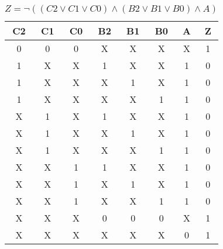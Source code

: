 \begin{center}
    \begin{table}[h] \caption{\(Z = \lnot ((C2 \lor C1 \lor C0) \land (B2 \lor B1 \lor B0) \land A) \)}
        \begin{center}
            \begin{tabular}{|c|c|c|c|c|c|c||c|} \hline
            C2 & C1 & C0 & B2 & B1 & B0 & A & Z \\ \hline\hline
            0  & 0  & 0  & X  & X  & X  & X & 1 \\ \hline
            1  & X  & X  & 1  & X  & X  & 1 & 0 \\ \hline
            1  & X  & X  & X  & 1  & X  & 1 & 0 \\ \hline
            1  & X  & X  & X  & X  & 1  & 1 & 0 \\ \hline
            X  & 1  & X  & 1  & X  & X  & 1 & 0 \\ \hline
            X  & 1  & X  & X  & 1  & X  & 1 & 0 \\ \hline
            X  & 1  & X  & X  & X  & 1  & 1 & 0 \\ \hline
            X  & X  & 1  & 1  & X  & X  & 1 & 0 \\ \hline
            X  & X  & 1  & X  & 1  & X  & 1 & 0 \\ \hline
            X  & X  & 1  & X  & X  & 1  & 1 & 0 \\ \hline
            X  & X  & X  & 0  & 0  & 0  & X & 1 \\ \hline
            X  & X  & X  & X  & X  & X  & 0 & 1 \\ \hline
            \end{tabular}
        \end{center}
    \end{table}
\end{center}
